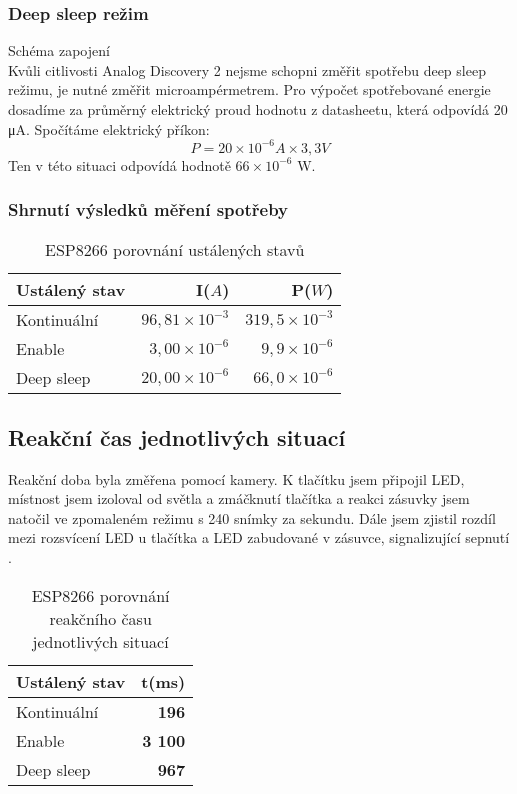 \documentclass[a4paper, 12pt]{report}
\begin{document}
				\subsubsection{Deep sleep režim}
					Schéma zapojení \\
					Kvůli citlivosti Analog Discovery 2 nejsme schopni změřit spotřebu deep sleep režimu, je nutné změřit microampérmetrem. Pro výpočet spotřebované energie dosadíme za průměrný elektrický proud hodnotu z datasheetu, která odpovídá 20 \si{\micro A}. Spočítáme elektrický příkon:
						$$P = 20\times 10^{-6} \si{A}\times 3,3 \si{V}$$
					Ten v této situaci odpovídá hodnotě $66 \times 10^{-6}$ \si{\watt}.

				\subsubsection{Shrnutí výsledků měření spotřeby}
					\begin{table}[]
						\centering
						\caption{ESP8266 porovnání ustálených stavů}
						\begin{tabular}{||l|r r||}
							\hline
							Ustálený stav & I($A$) & P($W$)\\
							\hline
							Kontinuální & $96,81 \times 10^{-3}$ & $319,5 \times 10^{-3}$\\
							Enable & $3,00\times 10^{-6}$ & $9,9 \times 10^{-6}$\\
							Deep sleep & $20,00\times 10^{-6}$ & $66,0 \times 10^{-6}$\\
							\hline
						\end{tabular}
						\label{ESP8266 klidové režimy}
					\end{table}

			\subsection{Reakční čas jednotlivých situací}
				Reakční doba byla změřena pomocí kamery. K tlačítku jsem připojil LED, místnost jsem izoloval od světla a zmáčknutí tlačítka a reakci zásuvky jsem natočil ve zpomaleném režimu s 240 snímky za sekundu. Dále jsem zjistil rozdíl mezi rozsvícení LED u tlačítka a LED zabudované v zásuvce, signalizující sepnutí .

				\begin{table}[]
					\centering
					\caption{ESP8266 porovnání reakčního času jednotlivých situací}
					\begin{tabular}{||l|r||}
						\hline
						Ustálený stav & t(ms)\\
						\hline
						Kontinuální & {\bf 196}\\
						Enable & {\bf 3 100}\\
						Deep sleep & {\bf 967}\\
						\hline
					\end{tabular}
					\label{ESP8266 klidové režimy čas}
				\end{table}
\end{document}
